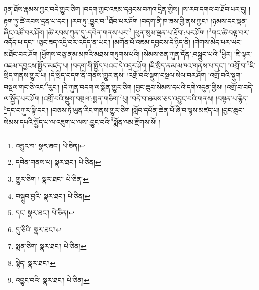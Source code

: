 ཉན་ཐོས་རྣམས་ཀྱང་བདེ་གྱུར་ཅིག །བདག་ཀྱང་འཇམ་དབྱངས་བཀའ་དྲིན་གྱིས། །ས་རབ་དགའ་བ་ཐོབ་པར་དུ། །རྟག་ཏུ་ཚེ་རབས་དྲན་པ་དང་། །རབ་ཏུ་:བྱུང་བ་\footnote{འབྱུང་བ་  སྣར་ཐང་།  པེ་ཅིན། }ཐོབ་པར་ཤོག །བདག་ནི་ཁ་ཟས་གྱི་ནས་ཀྱང་། །ཉམས་དང་ལྡན་ཞིང་འཚོ་བར་ཤོག །ཚེ་རབས་ཀུན་དུ་:དབེན་གནས་པར།\footnote{དབེན་གནས་པ།  སྣར་ཐང་།  པེ་ཅིན། } །ཕུན་སུམ་ལྡན་པ་ཐོབ་:པར་ཤོག །\footnote{གྱུར་ཅིག །  སྣར་ཐང་།  པེ་ཅིན། }གང་ཚེ་བལྟ་བར་འདོད་པ་དང་། །ཅུང་ཟད་འདྲི་བར་འདོད་ན་ཡང་། །མགོན་པོ་འཇམ་དབྱངས་དེ་ཉིད་ནི། །གེགས་མེད་པར་ཡང་མཐོང་བར་ཤོག །ཕྱོགས་བཅུ་ནམ་མཁའི་མཐས་གཏུགས་པའི། །སེམས་ཅན་ཀུན་དོན་:བསྒྲུབ་པའི་\footnote{བསྒྲུབ་བྱའི་  སྣར་ཐང་།  པེ་ཅིན། }ཕྱིར། །ཇི་ལྟར་འཇམ་དབྱངས་སྤྱོད་མཛད་པ། །བདག་གི་སྤྱོད་པའང་དེ་འདྲར་ཤོག །ཇི་སྲིད་ནམ་མཁའ་གནས་པ་དང་། །འགྲོ་བ་\footnote{དང་  སྣར་ཐང་།  པེ་ཅིན། }ཇི་སྲིད་གནས་གྱུར་པ། །དེ་སྲིད་བདག་ནི་གནས་གྱུར་ནས། །འགྲོ་བའི་སྡུག་བསྔལ་སེལ་བར་ཤོག །འགྲོ་བའི་སྡུག་བསྔལ་གང་ཅི་འང་\footnote{དུ་ཅིའི་  སྣར་ཐང་། }རུང་། །དེ་ཀུན་བདག་ལ་སྨིན་གྱུར་ཅིག །བྱང་ཆུབ་སེམས་དཔའི་དགེ་འདུན་གྱིས། །འགྲོ་བ་བདེ་ལ་སྤྱོད་པར་ཤོག །འགྲོ་བའི་སྡུག་བསྔལ་:སྨན་གཅིག་\footnote{སྨན་ཅིག་  སྣར་ཐང་།  པེ་ཅིན། }པུ། །བདེ་བ་ཐམས་ཅད་འབྱུང་བའི་གནས། །བསྟན་པ་རྙེད་\footnote{སྙེད་  སྣར་ཐང་། }དང་བཀུར་སྟི་དང་། །བཅས་ཏེ་ཡུན་རིང་གནས་གྱུར་ཅིག །སློབ་དཔོན་ཆེན་པོ་ཞི་བ་ལྷས་མཛད་པ། །བྱང་ཆུབ་སེམས་དཔའི་སྤྱོད་པ་ལ་འཇུག་པ་ལས་:བྱུང་བའི་\footnote{འབྱུང་བའི་  སྣར་ཐང་།  པེ་ཅིན། }སྨོན་ལམ་རྫོགས་སོ། ། 